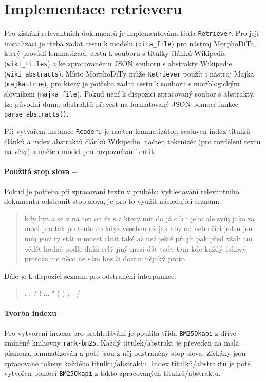 \section{Implementace retrieveru}
\label{retriever_imp}
Pro získání relevantních dokumentů je implementována třída \texttt{Retriever}. Pro její inicializaci je třeba zadat cestu k modelu (\texttt{dita\_file}) pro nástroj MorphoDiTa, který provádí lemmatizaci, cestu k souboru s titulky článků Wikipedie (\texttt{wiki\_titles}) a ke zpracovanému JSON souboru s abstrakty Wikipedie (\texttt{wiki\_abstracts}). Místo MorphoDiTy může \texttt{Retriever} použít i nástroj Majka (\texttt{majka=True}), pro který je potřeba zadat cestu k souboru s morfologickým slovníkem (\texttt{majka\_file}). Pokud není k dispozici zpracovaný soubor s abstrakty, lze původní dump abstraktů převést na formátovaný JSON pomocí funkce \texttt{parse\_abstracts()}.\par
Při vytváření instance \texttt{Readeru} je načten lemmatizátor, sestaven index titulků článků a index abstraktů článků Wikipedie, načten tokenizér (pro rozdělení textu na věty) a načten model pro rozpoznávání entit.\par

\paragraph{Použitá stop slova --}
Pokud je potřeba při zpracování textů v průběhu vyhledávání relevantního dokumentu odstranit stop slova, je pro to využit následující seznam:
\begin{quote}
    {\footnotesize kdy být a se v na ten on že s z který mít do já o k i jeho ale svůj jako za moci pro tak po tento co když všechen už jak aby od nebo říci jeden jen můj jenž ty stát u muset chtít také až než ještě při jít pak před však ani vědět hodně podle další celý jiný mezi dát tady tam kde každý takový protože nic něco ne sám bez či dostat nějaký proto}
\end{quote}
Dále je k dispozici seznam pro odstranění interpunkce:
\begin{quote}
    {\footnotesize . , ? ! ... " ( ) ; - /}
\end{quote}

\paragraph{Tvorba indexu --}
Pro vytvoření indexu pro prohledávání je použita třída \texttt{BM25Okapi} z dříve zmíněné knihovny \texttt{rank-bm25}. Každý titulek/abstrakt je převeden na malá písmena, lemmatizován a poté jsou z něj odstraněny stop slova. Získány jsou zpracované tokeny každého titulku/abstraktu. Index titulků/abstraktů je poté vytvořen pomocí \texttt{BM25Okapi} z takto zpracovaných titulků/abstraktů.

